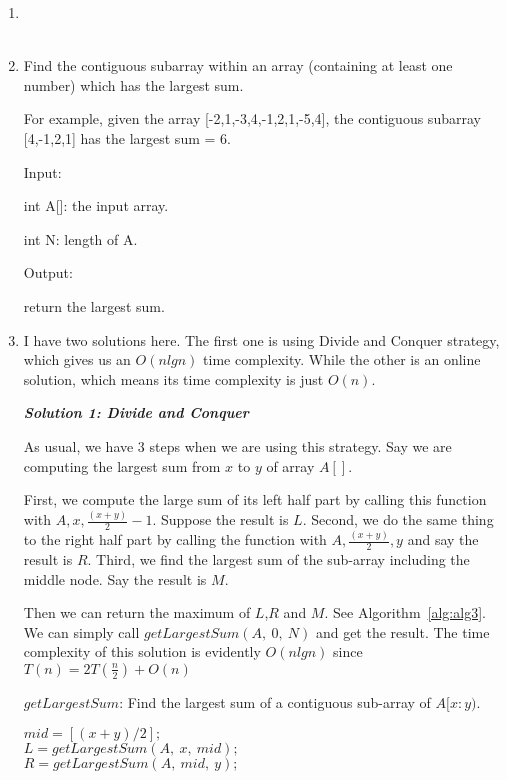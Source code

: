 \documentclass[12pt,a4paper]{article}
\makeatletter
\newtheorem*{solution}{Solution}
\renewenvironment{solution}[1][Solution] {\par\pushQED{\qed}\normalfont\topsep6\p@\@plus6\p@\relax\trivlist\item[\hskip\labelsep\bfseries#1\@addpunct{.}]\ignorespaces}{\popQED\endtrivlist\@endpefalse} \makeatother
\makeatother
\begin{document}
\begin{enumerate}
\begin{solution}
\end{solution}

~\\
~\\


\pagebreak
\item Find the contiguous subarray within an array (containing at least one number) which has the largest sum.

For example, given the array [-2,1,-3,4,-1,2,1,-5,4], the contiguous subarray [4,-1,2,1] has the largest sum = 6.

Input:

int A[]: the input array.

int N: length of A.

Output:

return the largest sum.


\begin{solution}
I have two solutions here. The first one is using Divide and Conquer strategy, which gives us an $O(nlgn)$ time complexity. While the other is an online solution, which means its time complexity is just $O(n)$.

\emph{\bf{Solution 1: Divide and Conquer }}

As usual, we have 3 steps when we are using this strategy. Say we are computing the largest sum from $x$ to $y$ of array $A[]$.

First, we compute the large sum of its left half part by calling this function with $A,x,\frac{(x+y)}{2}-1$. Suppose the result is $L$. Second, we do the same thing to the right half part by calling the function with $A,\frac{(x+y)}{2},y$ and say the result is $R$. Third, we find the largest sum of the sub-array including the middle node. Say the result is $M$.

Then we can return the maximum of $L$,$R$ and $M$. See Algorithm~\ref{alg:alg3}. We can simply call $getLargestSum(A,~0,~N)$ and get the result. The time complexity of this solution is evidently $O(nlgn)$ since $T(n)=2T(\frac{n}{2})+O(n)$


\begin{algorithm} 
  \label{alg:alg3}
  \caption{$getLargestSum$: Find the largest sum of a contiguous sub-array of $A[x:y)$.} 

  $mid = [(x+y)/2];$\\
  $L = getLargestSum(A,~x,~mid);$\\
  $R = getLargestSum(A,~mid,~y);$\\


\end{algorithm}
\end{solution}
\end{enumerate}
\end{document}
